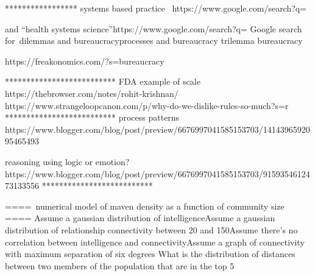 *****************
systems based practice 
https://www.google.com/search?q=%

and “health systems science”https://www.google.com/search?q=%
Google search for dilemmas and bureaucracyprocesses and bureaucracy
trilemma bureaucracy

https://freakonomics.com/?s=bureaucracy

**************************
FDA example of scale
https://thebrowser.com/notes/rohit-krishnan/
https://www.strangeloopcanon.com/p/why-do-we-dislike-rules-so-much?s=r
**************************
process patterns
https://www.blogger.com/blog/post/preview/6676997041585153703/1414396592095465493

reasoning using logic or emotion?
https://www.blogger.com/blog/post/preview/6676997041585153703/9159354612473133556
**************************

==== numerical model of maven density as a function of community size ====
Assume a gaussian distribution of intelligenceAssume a gaussian distribution of relationship connectivity between 20 and 150Assume there's no correlation between intelligence and connectivityAssume a graph of connectivity with maximum separation of six degrees
What is the distribution of distances between two members of the population that are in the top 5%
